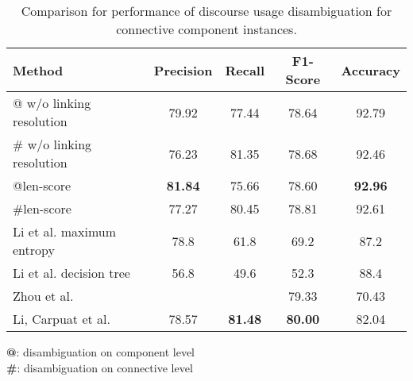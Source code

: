 \begin{table}[ht]
\centering
\begin{tabular}{|l|c|c|c|c|}
\hline

    Method                    &     Precision &     Recall &     F1-Score &     Accuracy \\ \hline
    @ w/o linking resolution  &     79.92     &     77.44  &     78.64    &     92.79    \\ \hline
    \# w/o linking resolution &     76.23     &     81.35  &     78.68    &     92.46    \\ \hline
    @len-score                & \bf 81.84     &     75.66  &     78.60    & \bf 92.96    \\ \hline
    \#len-score               &     77.27     &     80.45  &     78.81    &     92.61    \\

\hhline{|=|=|=|=|=|}

    Li et al. maximum entropy &     78.8      &     61.8   &     69.2     &     87.2     \\ \hline
    Li et al. decision tree   &     56.8      &     49.6   &     52.3     &     88.4     \\

\hhline{|=|=|=|=|=|}

    Zhou et al.               &               &            &     79.33    &     70.43    \\ \hline
    Li, Carpuat et al.        &     78.57     & \bf 81.48  & \bf 80.00    &     82.04    \\ \hline

\end{tabular}
\begin{flushleft}
\small
\textbf{@}: disambiguation on component level \\
\textbf{\#}: disambiguation on connective level \\
\end{flushleft}
\caption{\label{t:recognition-methods} Comparison for performance of discourse usage
disambiguation for connective component instances. }
\end{table}
